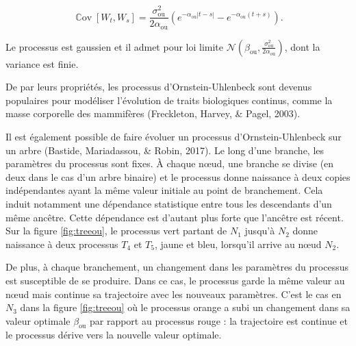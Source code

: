 \documentclass[12pt,a4paper]{reedthesis}
\DeclareMathOperator*{\cov}{\mathbb{C}\text{ov}}
\newcommand \CC [1]{\cov\left[{#1}\right]}
\newcommand \normal [2] {\mathcal{N}\left({#1},{#2}\right)}
\newcommand \ou [1]{{#1}_{\text{ou}}}
\newcommand \optim {\beta}
\theoremstyle{definition}
\theoremstyle{definition}
\theoremstyle{definition}
\theoremstyle{remark}
\begin{document}
\[\CC{W_t, W_s} = \frac{\ou{\sigma}^2}{2\ou{\alpha}}\left(e^{-\ou{\alpha} \left|t-s\right|} - e^{-\ou{\alpha} \left(t+s\right)}\right).\]

Le processus est gaussien et il admet pour loi limite \(\normal{\ou{\optim}}{\frac{\ou{\sigma}^2}{2\ou{\alpha}}}\), dont la variance est finie.

De par leurs propriétés, les processus d'Ornstein-Uhlenbeck sont devenus populaires pour modéliser l'évolution de traits biologiques continus, comme la masse corporelle des mammifères (Freckleton, Harvey, \& Pagel, 2003).

Il est également possible de faire évoluer un processus d'Ornstein-Uhlenbeck sur un
arbre (Bastide, Mariadassou, \& Robin, 2017). Le long d'une branche, les paramètres du processus sont fixes. À chaque nœud, une branche se divise (en deux dans le cas d'un arbre binaire) et le processus donne naissance à deux copies indépendantes ayant la même valeur initiale au point de branchement. Cela induit notamment une dépendance statistique entre tous les descendants d'un même ancêtre. Cette dépendance est d'autant plus forte que l'ancêtre est récent. Sur la figure \ref{fig:treeou}, le processus vert partant de \(N_1\) jusqu'à \(N_2\) donne naissance à deux processus \(T_4\) et \(T_5\), jaune et bleu, lorsqu'il arrive au nœud \(N_2\).

De plus, à chaque branchement, un changement dans les paramètres du processus est susceptible de se produire. Dans ce cas, le processus garde la même valeur au nœud mais continue sa trajectoire avec les nouveaux paramètres. C'est le cas en \(N_3\) dans la figure \ref{fig:treeou} où le processus orange a subi un changement dans sa valeur optimale \(\ou{\optim}\) par rapport au processus rouge : la trajectoire est continue et le processus dérive vers la nouvelle valeur optimale.
\end{document}
